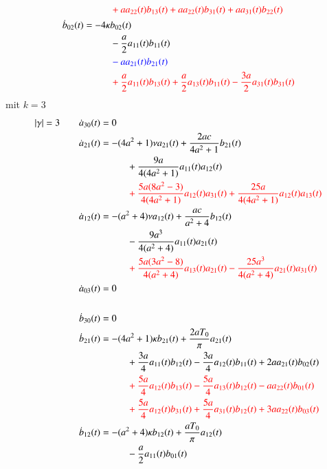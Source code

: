 \begin{refsection}
\begin{align*}
&\phantom{aaaaaaaaaa}
\color{red}
+
a
a_{22}(t) b_{13}(t)
+
a
a_{22}(t) b_{31}(t)
+
a
a_{31}(t) b_{22}(t)
\\
&
\dot{b}_{02}(t)
=
-
4
\kappa
b_{02}(t)
\\
&\phantom{aaaaaaaaaa}
-
\frac{a}{2} a_{11}(t) b_{11}(t)
\\
&\phantom{aaaaaaaaaa}
\color{blue}
-
a
a_{21}(t) b_{21}(t)
\\
&\phantom{aaaaaaaaaa}
\color{red}
+
\frac{a}{2} a_{11}(t) b_{13}(t)
+
\frac{a}{2} a_{13}(t) b_{11}(t)
-
\frac{3 a}{2} a_{31}(t) b_{31}(t)
\end{align*}
mit $k = 3$
\begin{align*}
|\gamma| = 3
\qquad &
\dot{a}_{30}(t) = 0
\\
&
\dot{a}_{21}(t)
=
-
(4 a^2+1)
\nu
a_{21}(t)
+
\frac{2 a c}{4 a^2+1} b_{21}(t)
\\
&\phantom{aaaaaaaaaa}
+
\frac{9 a}{4 (4 a^2+1)} a_{11}(t) a_{12}(t)
\\
&\phantom{aaaaaaaaaa}
\color{red}
+
\frac{5 a (8 a^2 - 3)}{4 (4 a^2+1)} a_{12}(t) a_{31}(t)
+
\frac{25 a}{4 (4 a^2+1)} a_{12}(t) a_{13}(t)
\\
&
\dot{a}_{12}(t)
=
-
(a^2+4)
\nu
a_{12}(t)
+
\frac{a c}{a^2+4} b_{12}(t)
\\
&\phantom{aaaaaaaaaa}
-
\frac{9 a^3}{4 (a^2+4)} a_{11}(t) a_{21}(t)
\\
&\phantom{aaaaaaaaaa}
\color{red}
+
\frac{5 a (3 a^2 - 8)}{4 (a^2+4)} a_{13}(t) a_{21}(t)
-
\frac{25 a^3}{4 (a^2+4)} a_{21}(t) a_{31}(t)
\\
&
\dot{a}_{03}(t) = 0
\\
\\
&
\dot{b}_{30}(t) = 0
\\
&
\dot{b}_{21}(t)
=
-
(4 a^2+1)
\kappa
b_{21}(t)
+
\frac{2 a T_{0}}{\pi} a_{21}(t)
\\
&\phantom{aaaaaaaaaa}
+
\frac{3 a}{4} a_{11}(t) b_{12}(t)
-
\frac{3 a}{4} a_{12}(t) b_{11}(t)
+
2 a
a_{21}(t) b_{02}(t)
\\
&\phantom{aaaaaaaaaa}
\color{red}
+
\frac{5 a}{4} a_{12}(t) b_{13}(t)
-
\frac{5 a}{4} a_{13}(t) b_{12}(t)
-
a
a_{22}(t) b_{01}(t)
\\
&\phantom{aaaaaaaaaa}
\color{red}
+
\frac{5 a}{4} a_{12}(t) b_{31}(t)
+
\frac{5 a}{4} a_{31}(t) b_{12}(t)
+
3 a
a_{22}(t) b_{03}(t)
\\
&
\dot{b}_{12}(t)
=
-
(a^2+4)
\kappa
b_{12}(t)
+
\frac{a T_{0}}{\pi} a_{12}(t)
\\
&\phantom{aaaaaaaaaa}
-
\frac{a}{2} a_{11}(t) b_{01}(t)
\\

\end{align*}
\end{refsection}
